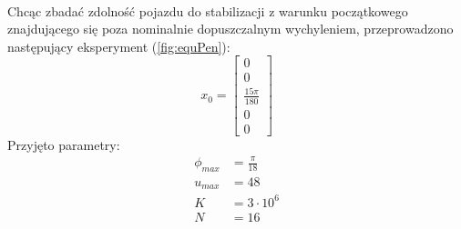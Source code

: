 \paragraph*{}
Chcąc zbadać zdolność pojazdu do stabilizacji z warunku początkowego znajdującego się poza nominalnie dopuszczalnym wychyleniem, przeprowadzono następujący eksperyment (\ref{fig:equPen}):
\begin{equation}
x_0=\begin{bmatrix}
0\\
0\\
\frac{15\pi}{180}\\
0\\
0
\end{bmatrix}
\end{equation}
Przyjęto parametry:
\begin{equation}
\label{eg:ogr}
\begin{aligned}
\phi_{max}&=\frac{\pi}{18}\\
u_{max}&=48\\
K&=3\cdot10^6\\
N&=16
\end{aligned}
\end{equation}

